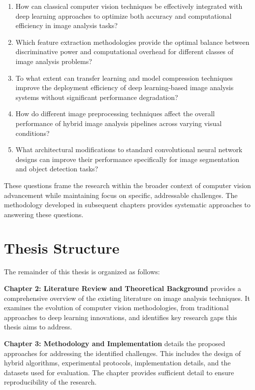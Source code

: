 \begin{enumerate}
    \item How can classical computer vision techniques be effectively integrated with deep learning approaches to optimize both accuracy and computational efficiency in image analysis tasks?
    
    \item Which feature extraction methodologies provide the optimal balance between discriminative power and computational overhead for different classes of image analysis problems?
    
    \item To what extent can transfer learning and model compression techniques improve the deployment efficiency of deep learning-based image analysis systems without significant performance degradation?
    
    \item How do different image preprocessing techniques affect the overall performance of hybrid image analysis pipelines across varying visual conditions?
    
    \item What architectural modifications to standard convolutional neural network designs can improve their performance specifically for image segmentation and object detection tasks?
\end{enumerate}

These questions frame the research within the broader context of computer vision advancement while maintaining focus on specific, addressable challenges. The methodology developed in subsequent chapters provides systematic approaches to answering these questions.

\section{Thesis Structure}
The remainder of this thesis is organized as follows:

\textbf{Chapter 2: Literature Review and Theoretical Background} provides a comprehensive overview of the existing literature on image analysis techniques. It examines the evolution of computer vision methodologies, from traditional approaches to deep learning innovations, and identifies key research gaps this thesis aims to address.

\textbf{Chapter 3: Methodology and Implementation} details the proposed approaches for addressing the identified challenges. This includes the design of hybrid algorithms, experimental protocols, implementation details, and the datasets used for evaluation. The chapter provides sufficient detail to ensure reproducibility of the research.


